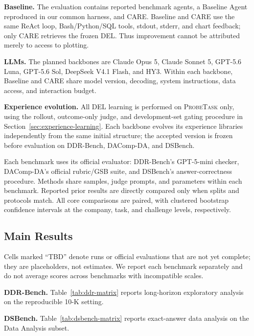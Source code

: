 \documentclass{article}
\newcommand{\method}{\textsc{CARE}}
\newcommand{\probe}{\textsc{ProbeTask}}
\begin{document}
\noindent\textbf{Baseline.} The evaluation contains reported benchmark agents, a Baseline Agent reproduced in our common harness, and \method{}.
Baseline and \method{} use the same ReAct loop, Bash/Python/SQL tools, stdout, stderr, and chart feedback; only \method{} retrieves the frozen DEL.
Thus improvement cannot be attributed merely to access to plotting.

\noindent\textbf{LLMs.} The planned backbones are Claude Opus 5, Claude Sonnet 5, GPT-5.6 Luna, GPT-5.6 Sol, DeepSeek V4.1 Flash, and HY3.
Within each backbone, Baseline and \method{} share model version, decoding, system instructions, data access, and interaction budget.

\noindent\textbf{Experience evolution.} All DEL learning is performed on \probe{} only, using the rollout, outcome-only judge, and development-set gating procedure in Section~\ref{sec:experience-learning}.
Each backbone evolves its experience libraries independently from the same initial structure; the accepted version is frozen before evaluation on DDR-Bench, DAComp-DA, and DSBench.

Each benchmark uses its official evaluator:
DDR-Bench's GPT-5-mini checker, DAComp-DA's official rubric/GSB suite, and DSBench's answer-correctness procedure.
Methods share samples, judge prompts, and parameters within each benchmark.
Reported prior results are directly compared only when splits and protocols match.
All core comparisons are paired, with clustered bootstrap confidence intervals at the company, task, and challenge levels, respectively.

\subsection{Main Results}
\label{sec:main-results}

Cells marked ``TBD'' denote runs or official evaluations that are not yet complete; they are placeholders, not estimates.
We report each benchmark separately and do not average scores across benchmarks with incompatible scales.

\noindent\textbf{DDR-Bench.} Table~\ref{tab:ddr-matrix} reports long-horizon exploratory analysis on the reproducible 10-K setting.

\noindent\textbf{DSBench.} Table~\ref{tab:dsbench-matrix} reports exact-answer data analysis on the Data Analysis subset.
\end{document}
